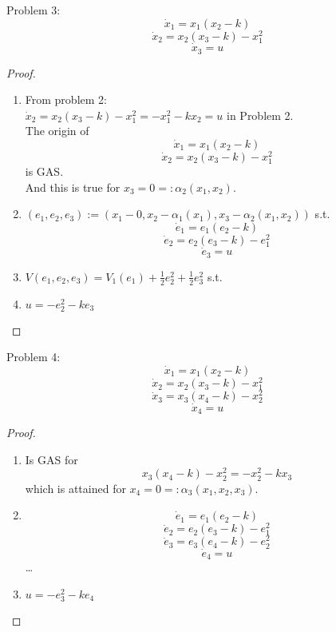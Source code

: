     Problem 3:
    $$\dot x_1 = x_1(x_2-k)$$
    $$\dot x_2 = x_2(x_3-k)-x_1^2$$
    $$\dot x_3 = u$$
    \begin{proof}
        \begin{enumerate}
            \item From problem 2: \\
            $\dot x_2 = x_2(x_3-k)-x_1^2 = - x_1^2-kx_2 = u$ in Problem 2.\\
            The origin of 
            $$\dot x_1 = x_1(x_2-k)$$
            $$\dot x_2 = x_2(x_3-k)-x_1^2$$
            is GAS. \\
            And this is true for $x_3 = 0 =: \alpha_2(x_1,x_2)$.
            \item $(e_1,e_2,e_3) := (x_1-0, x_2-\alpha_1(x_1), x_3-\alpha_2(x_1,x_2))$ s.t.
            $$\dot e_1 = e_1(e_2-k)$$
            $$\dot e_2 = e_2(e_3-k)-e_1^2$$
            $$\dot e_3 = u$$
            \item $V(e_1,e_2,e_3) = V_1(e_1)+\frac{1}{2}e_2^2+\frac{1}{2}e_3^2$ s.t. \\
            \item $u=-e_2^2-ke_3$
        \end{enumerate}
    \end{proof}
    
    Problem 4:
    $$\dot x_1 = x_1(x_2-k)$$
    $$\dot x_2 = x_2(x_3-k)-x_1^2$$
    $$\dot x_3 = x_3(x_4-k)-x_2^2$$
    $$\dot x_4 = u$$
    \begin{proof}
        \begin{enumerate}
            \item Is GAS for
            $$x_3(x_4-k)-x_2^2 = - x_2^2-kx_3$$
            which is attained for $x_4 = 0 =: \alpha_3(x_1,x_2,x_3)$.
            \item
            $$\dot e_1 = e_1(e_2-k)$$
            $$\dot e_2 = e_2(e_3-k)-e_1^2$$
            $$\dot e_3 = e_3(e_4-k)-e_2^2$$
            $$\dot e_4 = u$$
            \dots
            \item $u=-e_3^2-ke_4$
        \end{enumerate}
    \end{proof}
    

